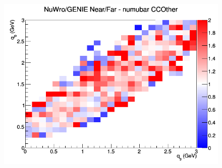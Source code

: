 \documentclass[12pt]{article}
\begin{document}
\begin{figure}[h]
\endminipage
{}
\includegraphics[width=\linewidth]{eff_q0_q3/LAr/ratios/CCOther_NuWro_GENIE_numubar_NF_q3_q0.png}
\endminipage
\newline
\end{figure}
\clearpage
\end{document}
